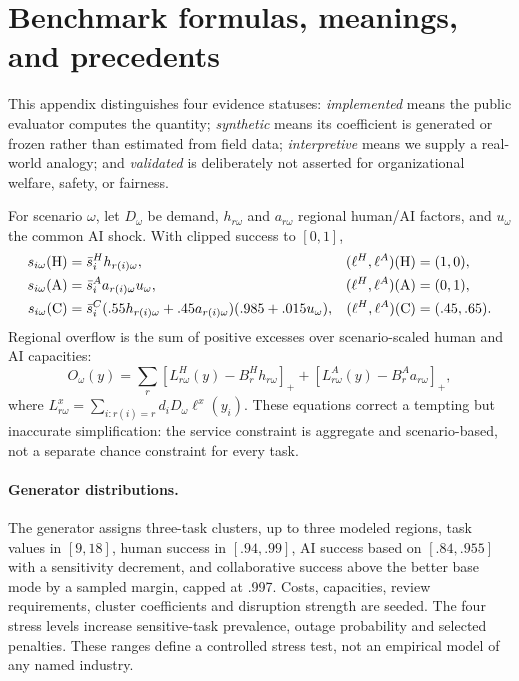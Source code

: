 \section{Benchmark formulas, meanings, and precedents}
\label{app:benchmark}

This appendix distinguishes four evidence statuses: \emph{implemented} means the public evaluator computes the quantity; \emph{synthetic} means its coefficient is generated or frozen rather than estimated from field data; \emph{interpretive} means we supply a real-world analogy; and \emph{validated} is deliberately not asserted for organizational welfare, safety, or fairness.

For scenario $\omega$, let $D_\omega$ be demand, $h_{r\omega}$ and $a_{r\omega}$ regional human/AI factors, and $u_\omega$ the common AI shock. With clipped success to $[0,1]$,
\begin{align}
s_{i\omega}(\mathrm{H})&=\bar s_i^H h_{r(i)\omega}, & (\ell^H,\ell^A)(\mathrm{H})&=(1,0),\\
s_{i\omega}(\mathrm{A})&=\bar s_i^A a_{r(i)\omega}u_\omega, &(\ell^H,\ell^A)(\mathrm{A})&=(0,1),\\
s_{i\omega}(\mathrm{C})&=\bar s_i^C(.55h_{r(i)\omega}+.45a_{r(i)\omega})(.985+.015u_\omega),
 &(\ell^H,\ell^A)(\mathrm{C})&=(.45,.65).
\end{align}
Regional overflow is the sum of positive excesses over scenario-scaled human and AI capacities:
\begin{equation}
 O_\omega(y)=\sum_r\left[L^H_{r\omega}(y)-B^H_rh_{r\omega}\right]_+ +
 \left[L^A_{r\omega}(y)-B^A_ra_{r\omega}\right]_+,
\end{equation}
where $L^x_{r\omega}=\sum_{i:r(i)=r}d_iD_\omega\ell^x(y_i)$. These equations correct a tempting but inaccurate simplification: the service constraint is aggregate and scenario-based, not a separate chance constraint for every task.



\paragraph{Generator distributions.}
The generator assigns three-task clusters, up to three modeled regions, task values in $[9,18]$, human success in $[.94,.99]$, AI success based on $[.84,.955]$ with a sensitivity decrement, and collaborative success above the better base mode by a sampled margin, capped at .997. Costs, capacities, review requirements, cluster coefficients and disruption strength are seeded. The four stress levels increase sensitive-task prevalence, outage probability and selected penalties. These ranges define a controlled stress test, not an empirical model of any named industry.

